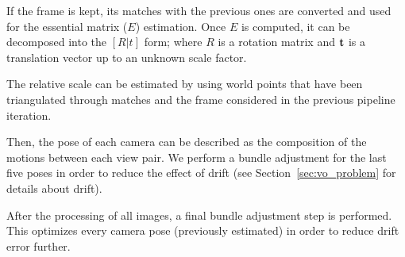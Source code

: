 If the frame is kept, its matches with the previous ones are converted
and used for the essential matrix ($E$) estimation. Once $E$ is computed, 
it can be decomposed into the \([R|t]\) form; where $R$ is a rotation matrix 
and $\mathbf{t}$ is a translation vector up to an unknown scale factor.

The relative scale can be estimated by using world points that have been 
triangulated through matches and the frame considered in the previous pipeline 
iteration.

Then, the pose of each camera can be described as the composition of the 
motions between each view pair. We perform a bundle adjustment for the last five 
poses in order to reduce the effect of drift (see Section~\ref{sec:vo_problem}
for details about drift).

After the processing of all images, a final bundle adjustment step is performed. 
This optimizes every camera pose (previously estimated) in order to reduce drift error further.


